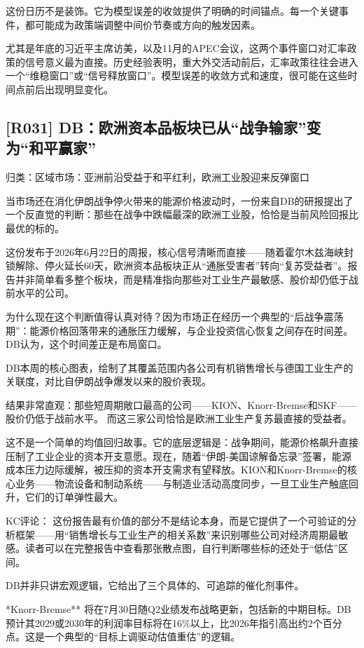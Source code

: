 \documentclass[11pt]{ctexart}
\begin{document}
这份日历不是装饰。它为模型误差的收敛提供了明确的时间锚点。每一个关键事件，都可能成为政策端调整中间价节奏或方向的触发因素。

尤其是年底的习近平主席访美，以及11月的APEC会议，这两个事件窗口对汇率政策的信号意义最为直接。历史经验表明，重大外交活动前后，汇率政策往往会进入一个“维稳窗口”或“信号释放窗口”。模型误差的收敛方式和速度，很可能在这些时间点前后出现明显变化。

\subsection{[R031] DB：欧洲资本品板块已从“战争输家”变为“和平赢家”}
{\small\color{refgray}归类：区域市场：亚洲前沿受益于和平红利，欧洲工业股迎来反弹窗口}

当市场还在消化伊朗战争停火带来的能源价格波动时，一份来自DB的研报提出了一个反直觉的判断：那些在战争中跌幅最深的欧洲工业股，恰恰是当前风险回报比最优的标的。

这份发布于2026年6月22日的周报，核心信号清晰而直接——随着霍尔木兹海峡封锁解除、停火延长60天，欧洲资本品板块正从“通胀受害者”转向“复苏受益者”。报告并非简单看多整个板块，而是精准指向那些对工业生产最敏感、股价却仍低于战前水平的公司。

为什么现在这个判断值得认真对待？因为市场正在经历一个典型的“后战争震荡期”：能源价格回落带来的通胀压力缓解，与企业投资信心恢复之间存在时间差。DB认为，这个时间差正是布局窗口。

DB本周的核心图表，绘制了其覆盖范围内各公司有机销售增长与德国工业生产的关联度，对比自伊朗战争爆发以来的股价表现。

结果非常直观：那些短周期敞口最高的公司——KION、Knorr-Bremse和SKF——股价仍低于战前水平。 而这三家公司恰恰是欧洲工业生产复苏最直接的受益者。

这不是一个简单的均值回归故事。它的底层逻辑是：战争期间，能源价格飙升直接压制了工业企业的资本开支意愿。现在，随着“伊朗-美国谅解备忘录”签署，能源成本压力边际缓解，被压抑的资本开支需求有望释放。KION和Knorr-Bremse的核心业务——物流设备和制动系统——与制造业活动高度同步，一旦工业生产触底回升，它们的订单弹性最大。

KC评论： 这份报告最有价值的部分不是结论本身，而是它提供了一个可验证的分析框架——用“销售增长与工业生产的相关系数”来识别哪些公司对经济周期最敏感。读者可以在完整报告中查看那张散点图，自行判断哪些标的还处于“低估”区间。

DB并非只讲宏观逻辑，它给出了三个具体的、可追踪的催化剂事件。

*Knorr-Bremse** 将在7月30日随Q2业绩发布战略更新，包括新的中期目标。DB预计其2029或2030年的利润率目标将在16\%以上，比2026年指引高出约2个百分点。这是一个典型的“目标上调驱动估值重估”的逻辑。
\end{document}
